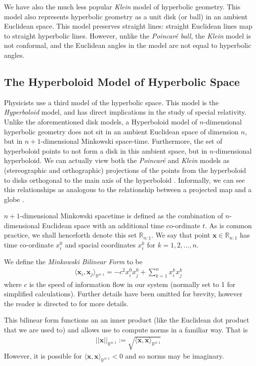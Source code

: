 \documentclass{article}
\begin{document}
We have also the much less popular \textit{Klein} model of hyperbolic geometry.
This model also represents hyperbolic geometry as a unit disk (or ball) in an ambient Euclidean space.
This model preserves straight lines: straight Euclidean lines map to straight hyperbolic lines.
However, unlike the \textit{Poincar\'e ball}, the \textit{Klein} model is not conformal, and the Euclidean angles in the model are not equal to hyperbolic angles. 

\subsection{The Hyperboloid Model of Hyperbolic Space}
Physicists use a third model of the hyperbolic space.
This model is the \textit{Hyperboloid} model, and has direct implications in the study of special relativity.
Unlike the aforementioned disk models, a Hyperboloid model of $n$-dimensional hyperbolic geometry does not sit in an ambient Euclidean space of dimension $n$, but in $n+1$-dimensional Minkowski space-time.
Furthermore, the set of hyperboloid points to not form a disk in this ambient space, but in $n$-dimensional hyperboloid.
We can actually view both the \textit{Poincar\'e} and \textit{Klein} models as (stereographic and orthographic) projections of the points from the hyperboloid to disks orthogonal to the main axis of the hyperboloid \cite{krioukov2010hyperbolic}.
Informally, we can see this relationships as analogous to the relationship between a projected map and a globe \cite{reynolds1993hyperbolic}.

$n+1$-dimensional Minkowski spacetime is defined as the combination of $n$-dimensional Euclidean space with an additional time co-ordinate $t$.
As is common practice, we shall henceforth denote this set $\mathbb{R}_{n:1}$.
We say that point $\textbf{x}\in \mathbb{R}_{n:1}$ has time co-ordinate  $x_i^0$ and spacial coordinates $x_i^k$ for $k=1,2,...,n$.

We define the \textit{Minkowski Bilinear Form} to be
\begin{align*}
\langle\textbf{x}_i, \textbf{x}_j\rangle_{\mathbb{R}^{n:1}} = -c^2 x_i^0 x_j^0 + \sum_{k=1}^n x_i^k x_j^k 
\end{align*}
where $c$ is the speed of information flow in our system (normally set to 1 for simplified calculations). Further details have been omitted for brevity, however the reader is directed to \cite{clough2017embedding} for more details.

This bilinear form functions an an inner product (like the Euclidean dot product that we are used to) and allows use to compute norms in a familiar way. 
That is
\begin{align*}
||\textbf{x}||_{\mathbb{R}^{n:1}}:= \sqrt{\langle \textbf{x}, \textbf{x} \rangle_{\mathbb{R}^{n:1}}}
\end{align*}
However, it is possible for $\langle \textbf{x}, \textbf{x} \rangle_{\mathbb{R}^{n:1}} < 0$ and so norms may be imaginary.
\end{document}

